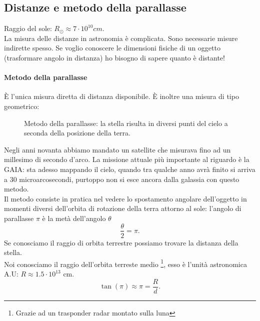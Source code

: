 \subsection{Distanze e metodo della parallasse}%
Raggio del sole: $R_{\odot} \approx 7 \cdot 10^{10} cm$.\\
La misura delle distanze in astronomia è complicata. Sono necessarie misure indirette spesso. Se voglio conoscere le dimensioni fisiche di un oggetto (trasformare angolo in distanza) ho bisogno di sapere quanto è distante! 
\paragraph{Metodo della parallasse}%
È l'unica misura diretta di distanza disponibile. È inoltre una misura di tipo geometrico:
\begin{figure}[H]
    \centering
    \caption{\scriptsize Metodo della parallasse: la stella risulta in diversi punti del cielo a seconda della posizione della terra.}
    \label{fig:metodo-della-parallasse}
\end{figure}
\noindent
Negli anni novanta abbiamo mandato un satellite che misurava fino ad un millesimo di secondo d'arco. La missione attuale più importante al riguardo è la GAIA: sta adesso mappando il cielo, quando tra qualche anno avrà finito si arriva a 30 microarcosecondi, purtoppo non si esce ancora dalla galassia con questo metodo.\\
Il metodo consiste in pratica nel vedere lo spostamento angolare dell'oggetto in momenti diversi dell'orbita di rotazione della terra attorno al sole: l'angolo di parallasse $\pi$ è la metà dell'angolo $\theta$
\[
	\frac{\theta}{2} = \pi
.\] 
Se conosciamo il raggio di orbita terrestre possiamo trovare la distanza della stella.\\
Noi conosciamo il raggio dell'orbita terreste medio \footnote{Grazie ad un trasponder radar montato sulla luna}, esso è l'unità astronomica A.U: $R \approx 1.5 \cdot 10^{13}$ cm.
\[
	\tan\left( \pi \right) \approx \pi  = \frac{R}{d}
.\] 

